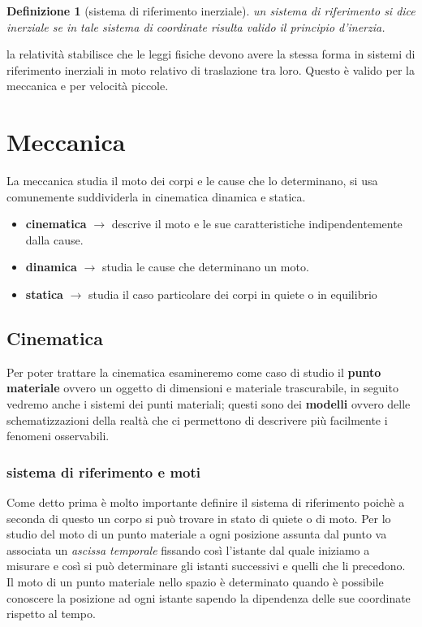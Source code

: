 \documentclass[a4paper,11pt,oneside]{book}
\theoremstyle{dispense}
\newtheorem{definizione}{Definizione}[chapter]
\begin{document}
\begin{definizione}[sistema di riferimento inerziale]
un sistema di riferimento si dice inerziale se in tale sistema di coordinate risulta valido il principio d'inerzia.\\
\end{definizione}

la relatività stabilisce che le leggi fisiche devono avere la stessa forma in sistemi di riferimento inerziali in moto relativo di traslazione tra loro. Questo è valido per la meccanica e per velocità piccole. 

\newpage
\chapter{Meccanica}
La meccanica studia il moto dei corpi e le cause che lo determinano, si usa comunemente suddividerla in cinematica dinamica e statica.
\begin{itemize}
\item \textbf{cinematica} $\to$ descrive il moto e le sue caratteristiche indipendentemente dalla cause.
\item \textbf{dinamica} $\to$ studia le cause che determinano un moto.
\item \textbf{statica} $\to$ studia il caso particolare dei corpi in quiete o in equilibrio 
\end{itemize}
\section{Cinematica}
Per poter trattare la cinematica esamineremo come caso di studio il \textbf{punto materiale} ovvero un oggetto di dimensioni e materiale trascurabile, in seguito vedremo anche i sistemi dei punti materiali; questi sono dei \textbf{modelli} ovvero delle schematizzazioni della realtà che ci permettono di descrivere più facilmente i fenomeni osservabili.\\
\subsection{sistema di riferimento e moti}
 Come detto prima è molto importante definire il sistema di riferimento poichè a seconda di questo un corpo si può trovare in stato di quiete o di moto. Per lo studio del moto di un punto materiale a ogni posizione assunta dal punto va associata un  \textit{ascissa temporale } fissando così l'istante dal quale iniziamo a misurare e così si può determinare gli istanti successivi e quelli che li precedono. \\
Il moto di un punto materiale nello spazio  è determinato quando è possibile conoscere la posizione ad ogni istante sapendo la dipendenza delle sue coordinate rispetto al tempo.
\noindent
\end{document}

